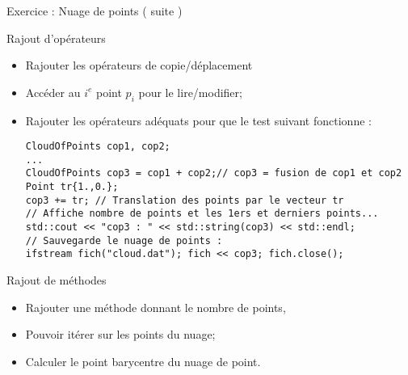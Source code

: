 \documentclass[handout,10pt]{beamer}
\begin{document}
\begin{frame}[fragile]{Exercice : Nuage de points ( suite )}
\tiny
\begin{exampleblock}{Rajout d'opérateurs}
 \begin{itemize}
  \item Rajouter les opérateurs de copie/déplacement
  \item Accéder au $i^{e}$ point $p_{i}$ pour le lire/modifier;
  \item Rajouter les opérateurs adéquats pour que le test suivant fonctionne :
\begin{lstlisting}
CloudOfPoints cop1, cop2;
...
CloudOfPoints cop3 = cop1 + cop2;// cop3 = fusion de cop1 et cop2
Point tr{1.,0.};
cop3 += tr; // Translation des points par le vecteur tr
// Affiche nombre de points et les 1ers et derniers points...
std::cout << "cop3 : " << std::string(cop3) << std::endl;
// Sauvegarde le nuage de points :
ifstream fich("cloud.dat"); fich << cop3; fich.close();
\end{lstlisting}
 \end{itemize}
\end{exampleblock}

\begin{exampleblock}{Rajout de méthodes}
 \begin{itemize}
  \item Rajouter une méthode donnant le nombre de points, 
  \item Pouvoir itérer sur les points du nuage;
  \item Calculer le point barycentre du nuage de point.
 \end{itemize}
\end{exampleblock}

\end{frame}
\end{document}
